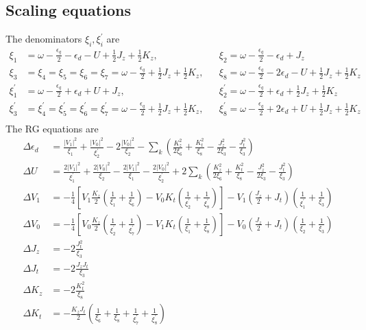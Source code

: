 \documentclass[12pt,twoside]{article}
\numberwithin{equation}{section}
\begin{document}
{\subsection{Scaling equations}
The denominators \(\xi_i,\xi_i^\prime\) are
\begin{equation}\begin{aligned}
	\xi_1 &= \omega - \frac{\epsilon_q}{2} - \epsilon_d - U + \frac{1}{2}J_z + \frac{1}{2}K_z, &&\xi_2 = \omega - \frac{\epsilon_q}{2} - \epsilon_d + J_z\\
	\xi_3 &= \xi_4 = \xi_5 = \xi_6 = \xi_7 = \omega - \frac{\epsilon_q}{2} + \frac{1}{2}J_z + \frac{1}{2}K_z, &&\xi_8 = \omega - \frac{\epsilon_q}{2} - 2\epsilon_d - U + \frac{1}{2}J_z + \frac{1}{2}K_z\\
	\xi_1^\prime &= \omega - \frac{\epsilon_q}{2} + \epsilon_d + U + J_z, &&\xi_2^\prime = \omega - \frac{\epsilon_q}{2} + \epsilon_d + \frac{1}{2}J_z + \frac{1}{2}K_z\\
	\xi_3^\prime &= \xi_4^\prime = \xi_5^\prime = \xi_6^\prime = \xi_7^\prime = \omega - \frac{\epsilon_q}{2} + \frac{1}{2}J_z + \frac{1}{2}K_z, &&\xi_8^\prime = \omega - \frac{\epsilon_q}{2} + 2\epsilon_d + U + \frac{1}{2}J_z + \frac{1}{2}K_z\\
\end{aligned}\end{equation}
The RG equations are
\begin{equation}\begin{aligned}
	\Delta \epsilon_d &= \frac{|V_1|^2}{\xi_1} + \frac{|V_0|^2}{\xi_2^\prime} - 2 \frac{|V_0|^2}{\xi_2} - \sum_k\left( \frac{K_z^2}{2\xi_6} + \frac{K_t^2}{\xi_8} - \frac{J_z^2}{2\xi_3} - \frac{J_t^2}{\xi_3}\right) \\
	\Delta U &= \frac{2|V_1|^2}{\xi^\prime_1} + \frac{2|V_0|^2}{\xi_2} - \frac{2|V_1|^2}{\xi_1} - \frac{2|V_0|^2}{\xi_2^\prime} + 2\sum_k\left(\frac{K_z^2}{2\xi_6} + \frac{K_t^2}{\xi_8} - \frac{J_z^2}{2\xi_3} - \frac{J_t^2}{\xi_3}\right) \\
	\Delta V_1 &= - \frac{1}{4}\left[ V_1 \frac{K_z}{2}\left( \frac{1}{\xi_1} + \frac{1}{\xi_6} \right) - V_0 K_t \left( \frac{1}{\xi_2^\prime} + \frac{1}{\xi_8^\prime} \right)\right] - V_1 \left( \frac{J_z}{2} + J_t \right) \left( \frac{1}{\xi_1^\prime} + \frac{1}{\xi_3} \right) \\
	\Delta V_0 &= - \frac{1}{4}\left[ V_0 \frac{K_z}{2}\left( \frac{1}{\xi_2^\prime} + \frac{1}{\xi_7^\prime} \right) - V_1 K_t \left( \frac{1}{\xi_1} + \frac{1}{\xi_8} \right)\right] - V_0 \left( \frac{J_z}{2} + J_t \right) \left( \frac{1}{\xi_2} + \frac{1}{\xi_3} \right) \\
	\Delta J_z &= - 2 \frac{J_t^2}{\xi_3}\\
	\Delta J_t &= - 2 \frac{J_z J_t}{\xi_3}\\
	\Delta K_z &= - 2 \frac{K_t^2}{\xi_8}\\
	\Delta K_t &= - \frac{K_z J_t}{2}\left( \frac{1}{\xi_6} + \frac{1}{\xi_8} + \frac{1}{\xi_7^\prime} + \frac{1}{\xi_8^\prime}\right) \\
\end{aligned}\end{equation}
}
\end{document}
